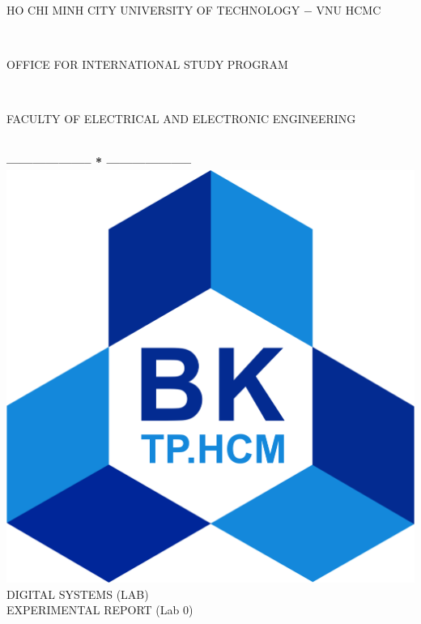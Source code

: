 \documentclass[13pt,a4paper]{report}
\begin{document}
\fontsize{13pt}{18pt}\selectfont
\begin{titlepage}
\thispagestyle{empty}
\thisfancypage{%
\setlength{\fboxsep}{0pt}%
\fbox}{} %
\

\begin{center}
\begin{large}
HO CHI MINH CITY UNIVERSITY OF TECHNOLOGY $-$ VNU HCMC
\end{large} \\
\begin{large}
OFFICE FOR INTERNATIONAL STUDY PROGRAM
\end{large} \\
\begin{large}
FACULTY OF ELECTRICAL AND ELECTRONIC ENGINEERING
\end{large} \\
\textbf{--------------------  *  --------------------}\\[4cm]
\includegraphics[scale=0.1]{logobk.png}\\[1cm]
{\fontsize{20pt}{1}\selectfont DIGITAL SYSTEMS (LAB)}\\
{\fontsize{20pt}{1}\selectfont EXPERIMENTAL REPORT (Lab 0)}\\[2.5cm]
\end{center}


\end{titlepage}
\end{document}
